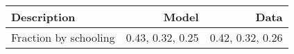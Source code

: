 \begin{tabular}{lrr}
\hline
Description & Model  & Data  \\ 
\hline
Fraction by schooling & 0.43, 0.32, 0.25  & 0.42, 0.32, 0.26  \\ 
\hline
\end{tabular}%
